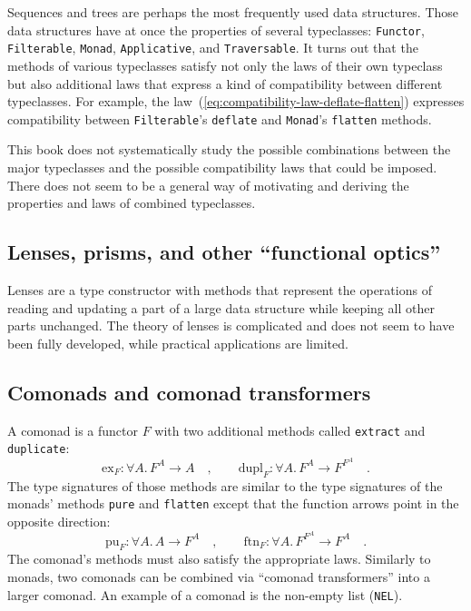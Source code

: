 Sequences and trees are perhaps the most frequently used data structures.
Those data structures have at once the properties of several typeclasses:
\lstinline!Functor!, \lstinline!Filterable!, \lstinline!Monad!,
\lstinline!Applicative!, and \lstinline!Traversable!. It turns out
that the methods of various typeclasses satisfy not only the laws
of their own typeclass but also additional laws that express a kind
of compatibility between different typeclasses. For example, the law~(\ref{eq:compatibility-law-deflate-flatten})
expresses compatibility between \lstinline!Filterable!\textsf{'}s \lstinline!deflate!
and \lstinline!Monad!\textsf{'}s \lstinline!flatten! methods.

This book does not systematically study the possible combinations
between the major typeclasses and the possible compatibility laws
that could be imposed. There does not seem to be a general way of
motivating and deriving the properties and laws of combined typeclasses.

\subsection{Lenses, prisms, and other \textquotedblleft functional optics\textquotedblright}

Lenses are a type constructor with methods that represent the operations
of reading and updating a part of a large data structure while keeping
all other parts unchanged. The theory of lenses is complicated and
does not seem to have been fully developed, while practical applications
are limited.

\subsection{Comonads and comonad transformers}

A comonad is a functor $F$ with two additional methods called \lstinline!extract!
and \lstinline!duplicate!:
\[
\text{ex}_{F}:\forall A.\,F^{A}\rightarrow A\quad,\quad\quad\text{dupl}_{F}:\forall A.\,F^{A}\rightarrow F^{F^{A}}\quad.
\]
The type signatures of those methods are similar to the type signatures
of the monads\textsf{'} methods \lstinline!pure! and \lstinline!flatten!
except that the function arrows point in the opposite direction:
\[
\text{pu}_{F}:\forall A.\,A\rightarrow F^{A}\quad,\quad\quad\text{ftn}_{F}:\forall A.\,F^{F^{A}}\rightarrow F^{A}\quad.
\]
The comonad\textsf{'}s methods must also satisfy the appropriate laws. Similarly
to monads, two comonads can be combined via \textsf{``}comonad transformers\textsf{''}
into a larger comonad. An example of a comonad is the non-empty list
(\lstinline!NEL!). 

